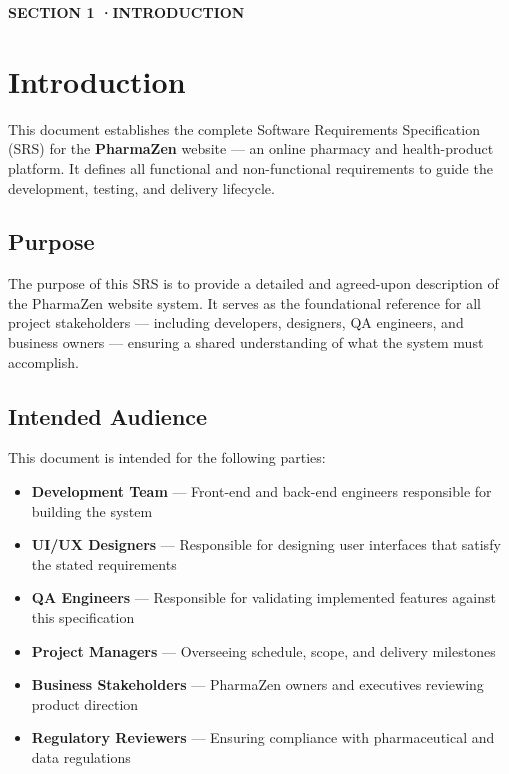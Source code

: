 \documentclass[12pt, a4paper]{article}
\newcommand{\sectionbadge}[2]{%
  \vspace{12pt}
  \noindent
  \colorbox{pharmagreen}{%
    \parbox{\dimexpr\textwidth-2\fboxsep\relax}{%
      \vspace{4pt}
      \color{white}\small\bfseries\MakeUppercase{SECTION #1 \quad·\quad #2}
      \vspace{4pt}
    }%
  }
  \vspace{6pt}
}
\begin{document}
\sectionbadge{1}{Introduction}
\section{Introduction}

This document establishes the complete Software Requirements Specification (SRS) for the \textbf{PharmaZen} website — an online pharmacy and health-product platform. It defines all functional and non-functional requirements to guide the development, testing, and delivery lifecycle.

\subsection{Purpose}

The purpose of this SRS is to provide a detailed and agreed-upon description of the PharmaZen website system. It serves as the foundational reference for all project stakeholders — including developers, designers, QA engineers, and business owners — ensuring a shared understanding of what the system must accomplish.

\subsection{Intended Audience}

This document is intended for the following parties:

\begin{itemize}[leftmargin=1.5em, itemsep=4pt]
  \item \textbf{Development Team} — Front-end and back-end engineers responsible for building the system
  \item \textbf{UI/UX Designers} — Responsible for designing user interfaces that satisfy the stated requirements
  \item \textbf{QA Engineers} — Responsible for validating implemented features against this specification
  \item \textbf{Project Managers} — Overseeing schedule, scope, and delivery milestones
  \item \textbf{Business Stakeholders} — PharmaZen owners and executives reviewing product direction
  \item \textbf{Regulatory Reviewers} — Ensuring compliance with pharmaceutical and data regulations
\end{itemize}
\end{document}
